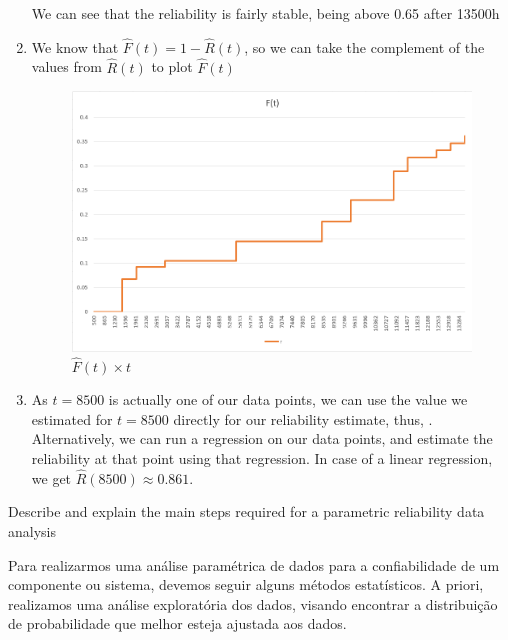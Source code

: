 \documentclass{article}
\begin{document}
\begin{enumerate}[label=(\alph*)]
    We can see that the reliability is fairly stable, being above 0.65 after 13500h
    \item We know that $\hat{F}(t) = 1 - \hat{R}(t)$, so we can take the complement of the values from $\hat{R}(t)$ to plot $\hat{F}(t)$

    \begin{figure}[H]
        \centering
        \includegraphics[width=0.8\linewidth]{q3_ft.png}
        \caption{$\hat{F}(t) \times t$}
        \label{fig:q3_km_ft}
    \end{figure}

    \item As $t=8500$ is actually one of our data points, we can use the value we estimated for $t=8500$ directly for our reliability estimate, thus, . Alternatively, we can run a regression on our data points, and estimate the reliability at that point using that regression. In case of a linear regression, we get $\hat{R}(8500) \approx 0.861$.
\end{enumerate}
\newpage

\setcounter{Question}{5}
\begin{question}
    Describe and explain the main steps required for a parametric reliability data analysis
\end{question}
Para realizarmos uma análise paramétrica de dados para a confiabilidade de um componente ou sistema, devemos seguir alguns métodos estatísticos. A priori, realizamos uma análise exploratória dos dados, visando encontrar a distribuição de probabilidade que melhor esteja ajustada aos dados.\par
\end{document}

